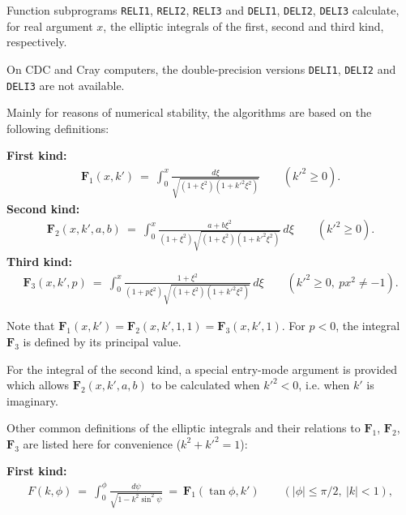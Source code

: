                        
                  
\Submitter{}                           
                      \Revised{}
Function subprograms {\tt RELI1}, {\tt RELI2}, {\tt RELI3}
and {\tt DELI1}, {\tt DELI2}, {\tt DELI3} calculate, for real
argument $x$, the elliptic integrals of the first, second and
third kind, respectively.
\par
On CDC and Cray computers, the double-precision versions {\tt DELI1},
{\tt DELI2} and {\tt DELI3} are not available.
\par
Mainly for reasons of numerical stability, the algorithms are based on
the following definitions:
\par
{\bf First kind:}
\begin{eqnarray*}
\mathbf{F}_1(x,k') \ = \  \displaystyle
\int_0^x \frac{d\xi}{\sqrt{(1+\xi^2)(1+{k'}^2\xi^2)}}
\qquad ({k'}^2 \ge 0).
\end{eqnarray*}
{\bf Second kind:}
\begin{eqnarray*}
\mathbf{F}_2(x,k',a,b) \ = \ \displaystyle
\int_0^x \frac{a+b\xi^2}{(1+\xi^2)\sqrt{(1+\xi^2)(1+{k'}^2\xi^2)}}\,d\xi
\qquad ({k'}^2 \ge 0).
\end{eqnarray*}
{\bf Third kind:}
\begin{eqnarray*}
\mathbf{F}_3(x,k',p) \ = \ \displaystyle
\int_0^x \frac{1+\xi^2}{(1+p\xi^2)\sqrt{(1+\xi^2)(1+{k'}^2\xi^2)}}\,d\xi
\qquad ({k'}^2 \ge 0, \ px^2 \ne -1).
\end{eqnarray*}
\par
Note that $\mathbf{F}_1(x,k') = \mathbf{F}_2(x,k',1,1) =
\mathbf{F}_3(x,k',1)$.
For $p < 0$, the integral $\mathbf{F}_3$ is defined by its principal
value.
\par
For the integral of the second kind, a special entry-mode argument
is provided which allows $\mathbf{F}_2(x,k',a,b)$ to be calculated when
${k'}^2 < 0$, i.e. when $k'$ is imaginary.
\par
Other common definitions of the elliptic integrals and their
relations to $\mathbf{F}_1$, $\mathbf{F}_2$, $\mathbf{F}_3$ are
listed here for convenience ($k^2+{k'}^2=1$):
\par
{\bf First kind:}
\begin{eqnarray*}
F(k,\phi) \ = \ \displaystyle \int_0^\phi
\frac{d\psi}{\sqrt{1-k^2\sin^2 \psi}} \ = \ \mathbf{F}_1(\tan \phi,k')
\qquad (|\phi| \le \pi/2, \ |k| < 1),
\end{eqnarray*}
